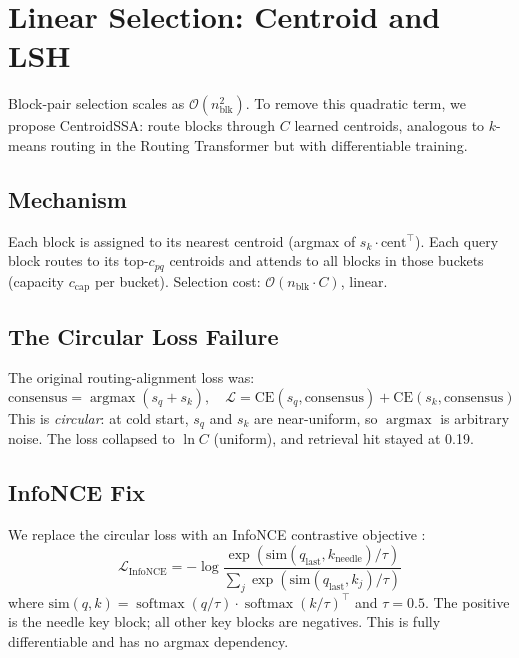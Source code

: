 \documentclass[10pt,letterpaper]{article}
\newcommand{\Ocomplex}{\mathcal{O}}
\newcommand{\softmax}{\operatorname{softmax}}
\begin{document}
\section{Linear Selection: Centroid and LSH}\label{sec:centroid}

Block-pair selection scales as $\Ocomplex(n_{\text{blk}}^2)$. To remove this
quadratic term, we propose CentroidSSA: route blocks through $C$ learned
centroids, analogous to $k$-means routing in the Routing Transformer
\cite{roy2021routing} but with differentiable training.

\subsection{Mechanism}

Each block is assigned to its nearest centroid (argmax of
$s_k \cdot \text{cent}^\top$). Each query block routes to its top-$c_{pq}$
centroids and attends to all blocks in those buckets (capacity $c_{\text{cap}}$
per bucket). Selection cost: $\Ocomplex(n_{\text{blk}} \cdot C)$, linear.

\subsection{The Circular Loss Failure}

The original routing-alignment loss was:
\begin{equation}
  \text{consensus} = \operatorname{argmax}(s_q + s_k), \quad
  \mathcal{L} = \text{CE}(s_q, \text{consensus}) + \text{CE}(s_k, \text{consensus})
\end{equation}
This is \emph{circular}: at cold start, $s_q$ and $s_k$ are near-uniform, so
$\operatorname{argmax}$ is arbitrary noise. The loss collapsed to $\ln C$ (uniform), and
retrieval hit stayed at 0.19.

\subsection{InfoNCE Fix}

We replace the circular loss with an InfoNCE contrastive objective
\cite{oord2018infonce}:
\begin{equation}
  \mathcal{L}_{\text{InfoNCE}} = -\log \frac{
    \exp(\text{sim}(q_{\text{last}}, k_{\text{needle}}) / \tau)
  }{
    \sum_{j} \exp(\text{sim}(q_{\text{last}}, k_j) / \tau)
  }
\end{equation}
where $\text{sim}(q, k) = \softmax(q/\tau) \cdot \softmax(k/\tau)^\top$ and
$\tau = 0.5$. The positive is the needle key block; all other key blocks are
negatives. This is fully differentiable and has no argmax dependency.
\end{document}
